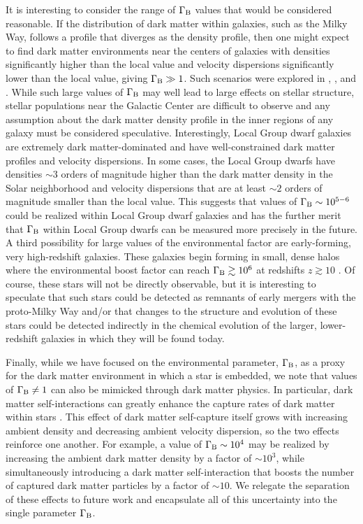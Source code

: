 \documentclass[useAMS,usenatbib]{mnras}
\begin{document}
 
It is interesting to consider the range of $\Gamma_\mathrm{B}$ values 
that would be considered reasonable. If the distribution of 
dark matter within galaxies, such as the Milky Way, follows a 
profile that diverges as the 
\citet[][NFW]{nfwprofile} density profile, then one might expect 
to find dark matter environments near the centers of galaxies with
densities significantly higher than the local value and velocity dispersions significantly
lower than the local value, giving $\Gamma_\mathrm{B} \gg 1$. Such scenarios 
were explored in \citet{Bertone_Fairbairn08}, \citet{Fairbairn+08}, 
and \citet{Scott+09}. While such large values of $\Gamma_\mathrm{B}$ may well 
lead to large effects on stellar structure, 
stellar populations near the Galactic Center
are difficult to observe and any assumption 
about the dark matter density profile in the 
inner regions of any galaxy must be considered speculative. 
Interestingly, Local Group dwarf galaxies are extremely dark matter-dominated 
and have well-constrained dark matter profiles and velocity dispersions. 
In some cases, the Local Group dwarfs have densities $\sim 3$ orders 
of magnitude higher than the dark matter density in the Solar neighborhood 
and velocity dispersions that are at least $\sim 2$ orders of magnitude 
smaller than the local value. This suggests that values of $\Gamma_\mathrm{B} \sim 10^{5-6}$ 
could be realized within Local Group dwarf galaxies and has the further merit that 
$\Gamma_\mathrm{B}$ within Local Group dwarfs can be measured more precisely in the future. 
A third possibility for large values of the environmental factor 
are early-forming, very high-redshift galaxies. These galaxies begin 
forming in small, dense halos where the environmental boost factor 
can reach $\Gamma_\mathrm{B} \gtrsim 10^6$ at redshifts $z \gtrsim 10$ \citep{KBD}. 
Of course, these stars will not be directly observable, but it 
is interesting to speculate that such stars could be detected as 
remnants of early mergers with the proto-Milky Way and/or that 
changes to the structure and evolution of these stars could be detected 
indirectly in the chemical evolution of the larger, lower-redshift 
galaxies in which they will be found today. 


Finally, while we have focused on the environmental parameter, $\Gamma_\mathrm{B}$, 
as a proxy for the dark matter environment in which a star is embedded, 
we note that values of $\Gamma_\mathrm{B} \ne 1$ can also be mimicked through dark matter 
physics. In particular, dark matter self-interactions can greatly 
enhance the capture rates of dark matter within 
stars \citep{Zentner2009High-energySun}. This effect of dark matter 
self-capture itself grows with increasing ambient density and 
decreasing ambient velocity dispersion, so the two effects 
reinforce one another. For example, a value of $\Gamma_\mathrm{B} \sim 10^4$ may 
be realized by increasing the ambient dark matter density by a 
factor of $\sim 10^3$, while simultaneously introducing a 
dark matter self-interaction that boosts the number of 
captured dark matter particles by a factor of $\sim 10$. 
We relegate the separation of these effects to future work 
and encapsulate all of this uncertainty into the single 
parameter $\Gamma_\mathrm{B}$. 
\end{document}
